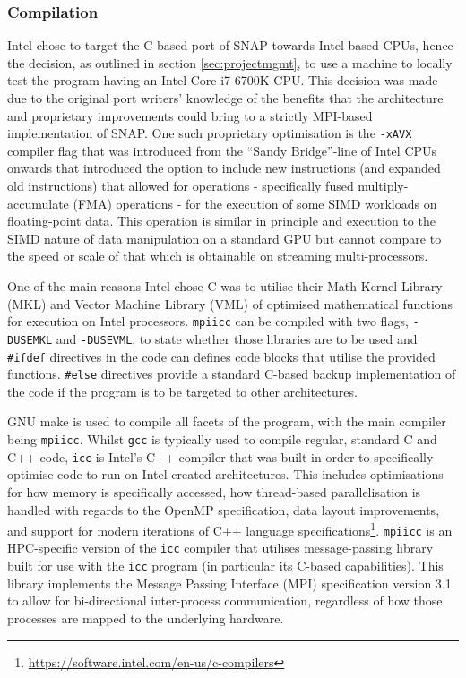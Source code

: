 \documentclass[conference]{IEEEtran}
\begin{document}
\subsubsection{Compilation}
\label{subsubsec:inv_compilation}

Intel chose to target the C-based port of SNAP towards Intel-based CPUs, hence the decision, as outlined in section \ref{sec:projectmgmt}, to use a machine to locally test the program having an Intel Core i7-6700K CPU. This decision was made due to the original port writers' knowledge of the benefits that the architecture and proprietary improvements could bring to a strictly MPI-based implementation of SNAP. One such proprietary optimisation is the \texttt{-xAVX} compiler flag that was introduced from the ``Sandy Bridge''-line of Intel CPUs onwards that introduced the option to include new instructions (and expanded old instructions) that allowed for operations - specifically fused multiply-accumulate (FMA) operations - for the execution of some SIMD workloads on floating-point data\cite{KanterIntel}. This operation is similar in principle and execution to the SIMD nature of data manipulation on a standard GPU but cannot compare to the speed or scale of that which is obtainable on streaming multi-processors.

One of the main reasons Intel chose C was to utilise their Math Kernel Library (MKL) and Vector Machine Library (VML) of optimised mathematical functions for execution on Intel processors. \texttt{mpiicc} can be compiled with two flags, \texttt{-DUSEMKL} and \texttt{-DUSEVML}, to state whether those libraries are to be used and \texttt{\#ifdef} directives in the code can defines code blocks that utilise the provided functions. \texttt{\#else} directives provide a standard C-based backup implementation of the code if the program is to be targeted to other architectures.

GNU make is used to compile all facets of the program, with the main compiler being \texttt{mpiicc}. Whilst \texttt{gcc} is typically used to compile regular, standard C and C++ code, \texttt{icc} is Intel's C++ compiler that was built in order to specifically optimise code to run on Intel-created architectures. This includes optimisations for how memory is specifically accessed, how thread-based parallelisation is handled with regards to the OpenMP specification, data layout improvements, and support for modern iterations of C++ language specifications\footnote{\url{https://software.intel.com/en-us/c-compilers}}. \texttt{mpiicc} is an HPC-specific version of the \texttt{icc} compiler that utilises message-passing library built for use with the \texttt{icc} program (in particular its C-based capabilities). This library implements the Message Passing Interface (MPI) specification version 3.1\cite{intel-mpi-ref} to allow for bi-directional inter-process communication, regardless of how those processes are mapped to the underlying hardware.
\end{document}
